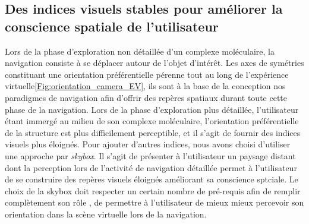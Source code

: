 
 


\subsection{Des indices visuels stables pour améliorer la conscience spatiale de l'utilisateur}




Lors de la phase d'exploration non détaillée d'un complexe moléculaire, la navigation consiste à se déplacer autour de l'objet d'intérêt. Les axes de symétries constituant une orientation préférentielle pérenne tout au long de l'expérience virtuelle\ref{Fig:orientation_camera_EV}, ils sont à la base de la conception nos paradigmes de navigation afin d'offrir des repères spatiaux durant toute cette phase de la navigation. Lors de la phase d'exploration plus détaillée, l'utilisateur étant immergé au milieu de son complexe moléculaire, l'orientation préférentielle de la structure est plus difficilement perceptible, et il s'agit de fournir des indices visuels plus éloignés. Pour ajouter d'autres indices, nous avons  choisi d'utiliser une approche par \textit{skybox}. Il s'agit de présenter à l'utilisateur un paysage distant  dont la perception lors de l'activité de navigation détaillée permet à l'utilisateur de se construire des repères visuels éloignés améliorant sa conscience sptciale. Le choix de la skybox doit respecter un certain nombre de pré-requis afin de remplir complètement son rôle \cite{vinson_design_1999}, de permettre à l'utilisateur de mieux mieux percevoir son orientation dans la scène virtuelle lors de la navigation. %

